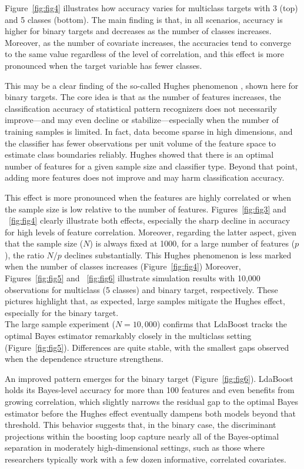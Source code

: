 \documentclass[11pt,a4paper]{article}
\begin{document}
\newpage
Figure~\ref{fig:fig4} illustrates how accuracy varies for multiclass targets with 3 (top) and 5 classes (bottom). The main finding is that, in all scenarios, accuracy is higher for binary targets and decreases as the number of classes increases. Moreover, as the number of covariate increases, the accuracies tend to converge to the same value regardless of the level of correlation, and this effect is more pronounced when the target variable has fewer classes.

This may be a clear finding of the so-called Hughes phenomenon \citep{hughes1968mean}, shown here for binary targets. The core idea is that as the number of features increases, the classification accuracy of statistical pattern recognizers does not necessarily improve—and may even decline or stabilize—especially when the number of training samples is limited. In fact, data become sparse in high dimensions, and the classifier has fewer observations per unit volume of the feature space to estimate class boundaries reliably. Hughes showed that there is an optimal number of features for a given sample size and classifier type. Beyond that point, adding more features does not improve and may harm classification accuracy.

This effect is more pronounced when the features are highly correlated or when the sample size is low relative to the number of features. Figures~\ref{fig:fig3} and ~\ref{fig:fig4} clearly illustrate both effects, especially the sharp decline in accuracy for high levels of feature correlation. Moreover, regarding the latter aspect, given that the sample size ($N$) is always fixed at 1000, for a large number of features ($p$), the ratio $N/p$ declines substantially. This Hughes phenomenon is less marked when the number of classes increases (Figure~\ref{fig:fig4}) 
Moreover, Figures~\ref{fig:fig5} and ~\ref{fig:fig6} illustrate simulation results with 10,000 observations for multiclass (5 classes) and binary target, respectively. These pictures highlight that, as expected, large samples mitigate the Hughes effect, especially for the binary target.\\[2ex]
The large sample experiment ($N = 10{,}000$) confirms that LdaBoost tracks the optimal Bayes estimator remarkably closely in the multiclass setting (Figure~\ref{fig:fig5}). Differences are quite stable, with the smallest gaps observed when the dependence structure strengthens. 

An improved pattern emerges for the binary target (Figure~\ref{fig:fig6}). LdaBoost holds its Bayes-level accuracy for more than 100 features and even benefits from growing correlation, which slightly narrows the residual gap to the optimal Bayes estimator before the Hughes effect eventually dampens both models beyond that threshold.
This behavior suggests that, in the binary case, the discriminant projections within the boosting loop capture nearly all of the Bayes-optimal separation in moderately high-dimensional settings, such as those where researchers typically work with a few dozen informative, correlated covariates.
\end{document}
